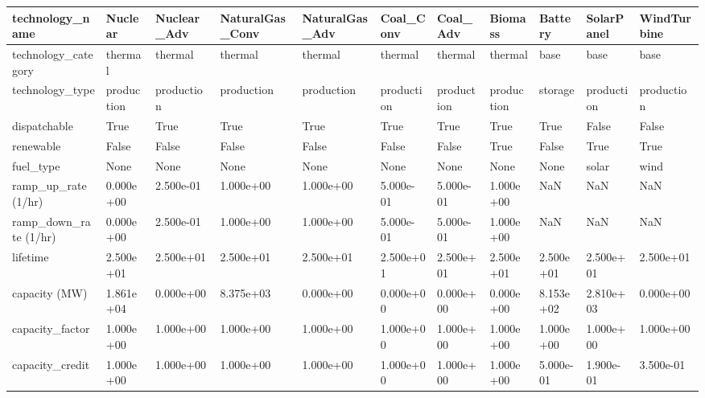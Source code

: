 \begin{tabular}{lllllllllll}
\toprule
technology\_name &     Nuclear & Nuclear\_Adv & NaturalGas\_Conv & NaturalGas\_Adv &   Coal\_Conv &    Coal\_Adv &     Biomass &    Battery &  SolarPanel & WindTurbine \\
\midrule
technology\_category                     &     thermal &     thermal &         thermal &        thermal &     thermal &     thermal &     thermal &       base &        base &        base \\
technology\_type                         &  production &  production &      production &     production &  production &  production &  production &    storage &  production &  production \\
dispatchable                            &        True &        True &            True &           True &        True &        True &        True &       True &       False &       False \\
renewable                               &       False &       False &           False &          False &       False &       False &        True &      False &        True &        True \\
fuel\_type                               &        None &        None &            None &           None &        None &        None &        None &       None &       solar &        wind \\
ramp\_up\_rate (1/hr)                     &   0.000e+00 &   2.500e-01 &       1.000e+00 &      1.000e+00 &   5.000e-01 &   5.000e-01 &   1.000e+00 &        NaN &         NaN &         NaN \\
ramp\_down\_rate (1/hr)                   &   0.000e+00 &   2.500e-01 &       1.000e+00 &      1.000e+00 &   5.000e-01 &   5.000e-01 &   1.000e+00 &        NaN &         NaN &         NaN \\
lifetime                                &   2.500e+01 &   2.500e+01 &       2.500e+01 &      2.500e+01 &   2.500e+01 &   2.500e+01 &   2.500e+01 &  2.500e+01 &   2.500e+01 &   2.500e+01 \\
capacity (MW)                           &   1.861e+04 &   0.000e+00 &       8.375e+03 &      0.000e+00 &   0.000e+00 &   0.000e+00 &   0.000e+00 &  8.153e+02 &   2.810e+03 &   0.000e+00 \\
capacity\_factor                         &   1.000e+00 &   1.000e+00 &       1.000e+00 &      1.000e+00 &   1.000e+00 &   1.000e+00 &   1.000e+00 &  1.000e+00 &   1.000e+00 &   1.000e+00 \\
capacity\_credit                         &   1.000e+00 &   1.000e+00 &       1.000e+00 &      1.000e+00 &   1.000e+00 &   1.000e+00 &   1.000e+00 &  5.000e-01 &   1.900e-01 &   3.500e-01 \\

\end{tabular}
